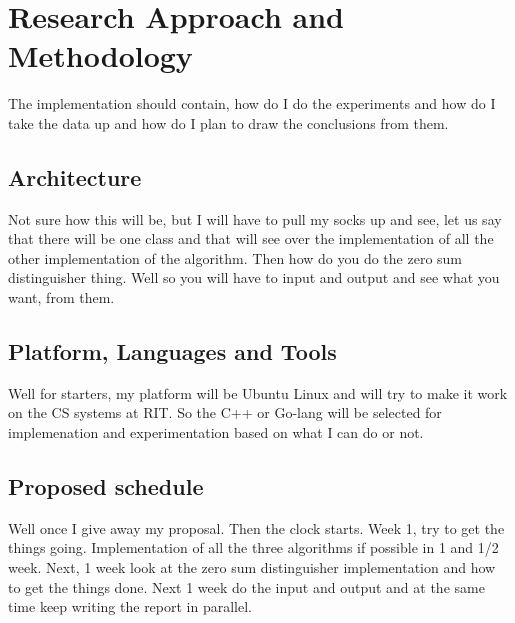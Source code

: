 \chapter{Research Approach and Methodology}







The implementation should contain, how do I do the experiments and how do I take the data up
and how do I plan to draw the conclusions from them.

\section{Architecture}
  Not sure how this will be, but I will have to pull my socks up and see, let us say that there will be one class
  and that will see over the implementation of all the other implementation of the algorithm. Then how do you do the
  zero sum distinguisher thing. Well so you will have to input and output and see what you want, from them.

\section{Platform, Languages and Tools}
Well for starters, my platform will be Ubuntu Linux and will try to make it work on the CS systems at RIT. So the
C++ or Go-lang will be selected for implemenation and experimentation based on what I can do or not.

\section{Proposed schedule}
Well once I give away my proposal. Then the clock starts. Week 1, try to get the things going. Implementation of all
the three algorithms if possible in 1 and 1/2 week. Next, 1 week look at the zero sum distinguisher implementation
and how to get the things done. Next 1 week do the input and output and at the same time keep writing the report in
parallel.
